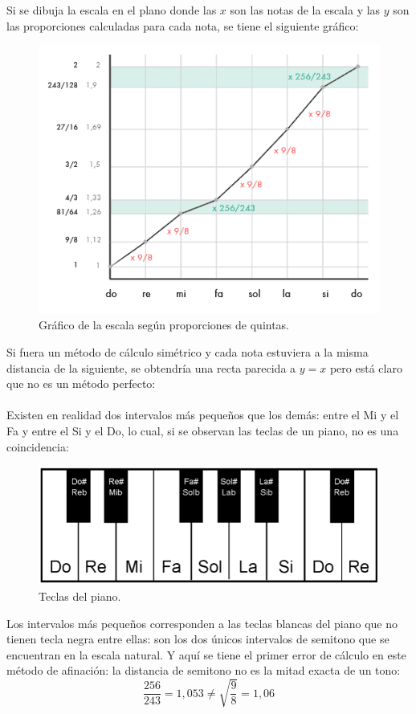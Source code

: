 \documentclass[a4paper, openright, 11pt, titlepage]{report}
\theoremstyle{definition}\newtheorem{defin}[propo]{Definition}
\theoremstyle{definition}\newtheorem{obser}[propo]{Remark}
\theoremstyle{definition}\newtheorem{ejem}[propo]{Ejemplo}
\theoremstyle{definition}\newtheorem{algoritmo}[propo]{Algoritmo}
\begin{document}
Si se dibuja la escala en el plano donde las $x$ son las notas de la escala y las $y$ son las proporciones calculadas para cada nota, se tiene el siguiente gráfico:
\begin{figure}[H]
    \centering
    \includegraphics[scale = 0.9]{graficoEscala.png}
    \caption{Gráfico de la escala según proporciones de quintas.}
\end{figure}
Si fuera un método de cálculo simétrico y cada nota estuviera a la misma distancia de la siguiente, se obtendría una recta parecida a $y = x$ pero está claro que no es un método perfecto:\\\\
Existen en realidad dos intervalos más pequeños que los demás: entre el Mi y el Fa y entre el Si y el Do, lo cual, si se observan las teclas de un piano, no es una coincidencia:
\begin{figure}[H]
    \centering
    \includegraphics[scale = 0.5]{teclasPiano.png}
    \caption{Teclas del piano.}
\end{figure}
Los intervalos más pequeños corresponden a las teclas blancas del piano que no tienen tecla negra entre ellas: son los dos únicos intervalos de semitono que se encuentran en la escala natural. Y aquí se tiene el primer error de cálculo en este método de afinación: la distancia de semitono no es la mitad exacta de un tono: $$\frac{256}{243} = 1,053 \not= \sqrt{\frac{9}{8}} = 1,06$$
\end{document}
